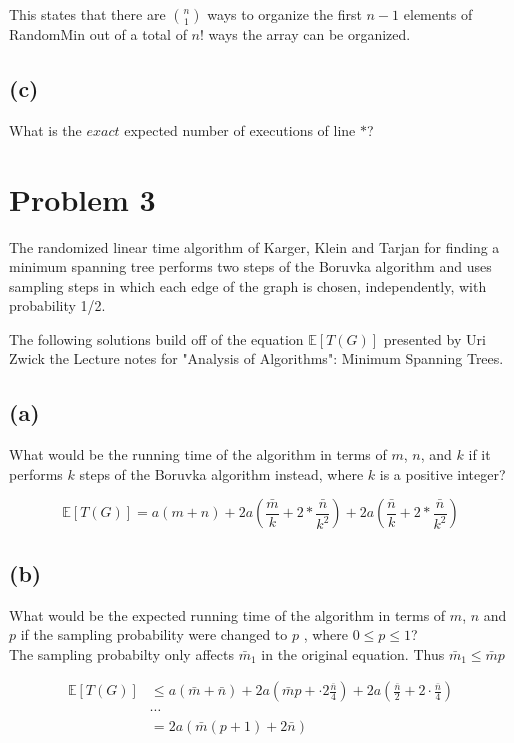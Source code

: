 \documentclass[12pt]{article}
\begin{document}
This states that there are $\binom{n}{1}$ ways to organize the first $n
- 1$ elements of RandomMin out of a total of $n!$ ways the array can be
organized.

\subsection*{(c)}
What is the $exact$ expected number of executions of line \(*\)?


\section*{Problem 3}
The randomized linear time algorithm of Karger, Klein and Tarjan for
finding a minimum spanning tree performs two steps of the Boruvka
algorithm and uses sampling steps in which each edge of the graph is
chosen, independently, with probability 1/2.\newline

The following solutions build off of the equation $\mathbb{E}[T(G)]$
presented by Uri Zwick the Lecture notes for "Analysis of
Algorithms": Minimum Spanning Trees.


\subsection*{(a)}
What would be the running time of the algorithm in terms of $m$, $n$,
and $k$ if it performs $k$ steps of the Boruvka algorithm instead,
where $k$ is a positive integer?

\begin{equation*}
    \mathbb{E}[T(G)] = a(m + n) + 2a(\frac{\bar{m}}{k} + 2 * \frac{\bar{n}}{k^2}) +
    2a(\frac{\bar{n}}{k} + 2 * \frac{\bar{n}}{k^2})
\end{equation*}

\subsection*{(b)}
What would be the expected running time of the algorithm in terms of
$m$, $n$ and $p$ if the sampling probability were changed to $p$ ,
where $0 \le p \le 1$?\\

The sampling probabilty only affects $\bar{m}_1$ in the original equation.
Thus $\bar{m}_1 \le \bar{m}p$

\begin{align*}
    \mathbb{E}[T(G)] &\le a(\bar{m} + \bar{n}) + 2a\left(\bar{m}p
                      + \cdot2\frac{\bar{n}}{4}\right)
                      + 2a(\frac{\bar{n}}{2} + 2\cdot\frac{\bar{n}}{4})\\
                     & \cdots \\
                     &= 2a(\bar{m}(p + 1) + 2\bar{n})
\end{align*}
\end{document}
